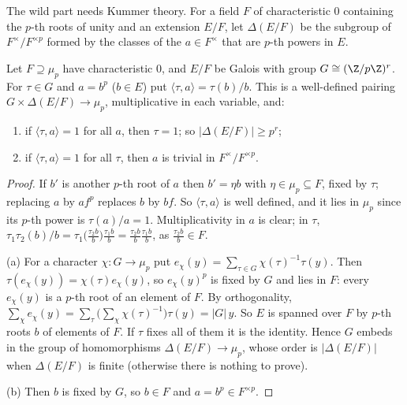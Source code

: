 The wild part needs Kummer theory. For a field $F$ of characteristic $0$ containing the $p$-th roots of unity and an extension $E/F$, let
$\Delta(E/F)$ be the subgroup of $F^\times/F^{\times p}$ formed by the classes of the $a\in F^\times$ that are $p$-th powers in $E$.

\begin{lemma}[Kummer]\label{lem:kummerelem}
Let $F\supseteq\mu_p$ have characteristic $0$, and $E/F$ be Galois with group $G\cong(\Z/p\Z)^r$. For $\tau\in G$ and $a=b^p$ ($b\in E$) put
$\langle\tau,a\rangle=\tau(b)/b$. This is a well-defined pairing $G\times\Delta(E/F)\to\mu_p$, multiplicative in each variable, and:
\begin{enumerate}[label=(\alph*)]
\item if $\langle\tau,a\rangle=1$ for all $a$, then $\tau=1$; so $|\Delta(E/F)|\ge p^r$;
\item if $\langle\tau,a\rangle=1$ for all $\tau$, then $a$ is trivial in $F^\times/F^{\times p}$.
\end{enumerate}
\end{lemma}
\begin{proof}
If $b'$ is another $p$-th root of $a$ then $b'=\eta b$ with $\eta\in\mu_p\subseteq F$, fixed by $\tau$; replacing $a$ by $af^p$ replaces $b$ by $bf$. So
$\langle\tau,a\rangle$ is well defined, and it lies in $\mu_p$ since its $p$-th power is $\tau(a)/a=1$. Multiplicativity in $a$ is clear; in $\tau$,
$\tau_1\tau_2(b)/b=\tau_1\bigl(\tfrac{\tau_2b}b\bigr)\tfrac{\tau_1b}b=\tfrac{\tau_2b}b\tfrac{\tau_1b}b$, as $\tfrac{\tau_2b}b\in F$.

(a) For a character $\chi:G\to\mu_p$ put $e_\chi(y)=\sum_{\tau\in G}\chi(\tau)^{-1}\tau(y)$. Then $\tau(e_\chi(y))=\chi(\tau)e_\chi(y)$, so
$e_\chi(y)^p$ is fixed by $G$ and lies in $F$: every $e_\chi(y)$ is a $p$-th root of an element of $F$. By orthogonality,
$\sum_\chi e_\chi(y)=\sum_\tau\bigl(\sum_\chi\chi(\tau)^{-1}\bigr)\tau(y)=|G|\,y$. So $E$ is spanned over $F$ by $p$-th roots $b$ of elements of $F$. If
$\tau$ fixes all of them it is the identity. Hence $G$ embeds in the group of homomorphisms $\Delta(E/F)\to\mu_p$, whose order is
$|\Delta(E/F)|$ when $\Delta(E/F)$ is finite (otherwise there is nothing to prove).

(b) Then $b$ is fixed by $G$, so $b\in F$ and $a=b^p\in F^{\times p}$.
\end{proof}

